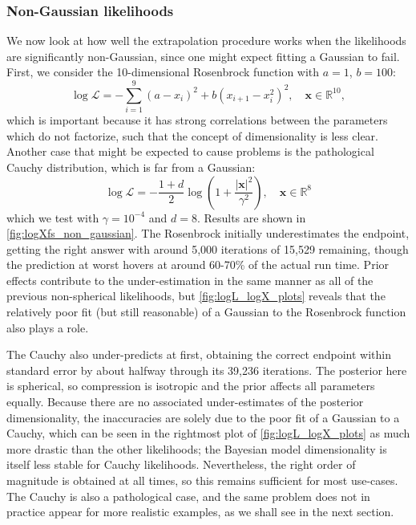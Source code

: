 \documentclass[usenatbib]{mnras}
\newcommand{\Like}{\mathcal{L}}
\begin{document}
\subsubsection{Non-Gaussian likelihoods}
We now look at how well the extrapolation procedure works when the likelihoods are significantly non-Gaussian, since one might expect fitting a Gaussian to fail. 
First, we consider the 10-dimensional Rosenbrock function with $a = 1$,  $b = 100$:
\begin{equation}
    \log \Like = - \sum_{i = 1}^{9} \left(a - x_i\right)^2 + b\left(x_{i+1} - x_i^2\right)^2, \quad \bm{x} \in \mathbb{R}^{10},
\end{equation}
which is important because it has strong correlations between the parameters which do not factorize, such that the concept of dimensionality is less clear. Another case that might be expected to cause problems is the pathological Cauchy distribution, which is far from a Gaussian:
\begin{equation}
    \log\Like = - \frac{1+d}{2} \log \left( 1 + \frac{|\bm{x}|^2}{\gamma^2}\right), \quad \bm{x} \in \mathbb{R}^8
\end{equation}
which we test with $\gamma = 10^{-4}$ and $d = 8$. Results are shown in \cref{fig:logXfs_non_gaussian}. The Rosenbrock initially underestimates the endpoint, getting the right answer with around 5,000 iterations of 15,529 remaining, though the prediction at worst hovers at around 60-70\% of the actual run time. Prior effects contribute to the under-estimation in the same manner as all of the previous non-spherical likelihoods, but \cref{fig:logL_logX_plots} reveals that the relatively poor fit (but still reasonable) of a Gaussian to the Rosenbrock function also plays a role.
\par
The Cauchy also under-predicts at first, obtaining the correct endpoint within standard error by about halfway through its 39,236 iterations. The posterior here is spherical, so compression is isotropic and the prior affects all parameters equally. Because there are no associated under-estimates of the posterior dimensionality, the inaccuracies are solely due to the poor fit of a Gaussian to a Cauchy, which can be seen in the rightmost plot of \cref{fig:logL_logX_plots} as much more drastic than the other likelihoods; the Bayesian model dimensionality is itself less stable for Cauchy likelihoods. Nevertheless, the right order of magnitude is obtained at all times, so this remains sufficient for most use-cases. The Cauchy is also a pathological case, and the same problem does not in practice appear for more realistic examples, as we shall see in the next section.
\end{document}
